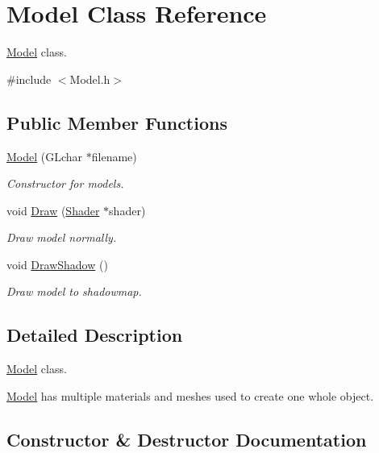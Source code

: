 \hypertarget{class_model}{}\section{Model Class Reference}
\label{class_model}


\mbox{\hyperlink{class_model}{Model}} class.  




{\ttfamily \#include $<$Model.\+h$>$}

\subsection*{Public Member Functions}
\begin{DoxyCompactItemize}
\item 
\mbox{\hyperlink{class_model_a0521de97cb482940ccf4a416d35fa336}{Model}} (G\+Lchar $\ast$filename)
\begin{DoxyCompactList}\small\item\em Constructor for models. \end{DoxyCompactList}\item 
void \mbox{\hyperlink{class_model_a8444e404fcc9cc66827c2f628b92ece3}{Draw}} (\mbox{\hyperlink{class_shader}{Shader}} $\ast$shader)
\begin{DoxyCompactList}\small\item\em Draw model normally. \end{DoxyCompactList}\item 
void \mbox{\hyperlink{class_model_ac2e396a05a6b7af011c213dcbd2dae21}{Draw\+Shadow}} ()
\begin{DoxyCompactList}\small\item\em Draw model to shadowmap. \end{DoxyCompactList}\end{DoxyCompactItemize}


\subsection{Detailed Description}
\mbox{\hyperlink{class_model}{Model}} class. 

\mbox{\hyperlink{class_model}{Model}} has multiple materials and meshes used to create one whole object. 

\subsection{Constructor \& Destructor Documentation}
\mbox{\label{class_model_a0521de97cb482940ccf4a416d35fa336}} 
